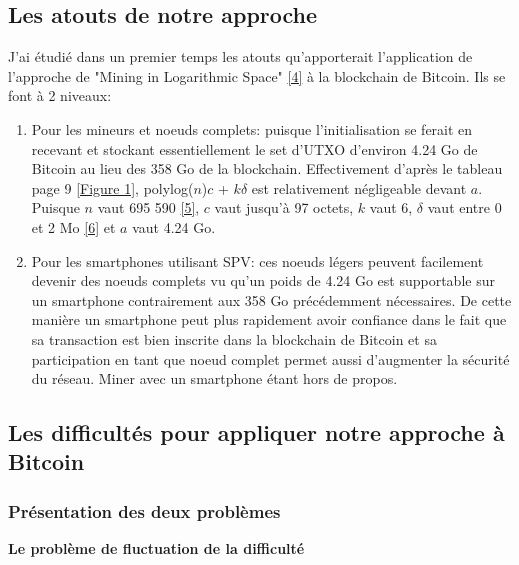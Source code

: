 \documentclass[12pt,a4paper]{article}
\newcommand{\source}[1]{\hyperlink{#1}{[#1]}}
\newcommand{\annexe}[2]{\hyperlink{#1}{[Figure #2]}}
\begin{document}
	\subsection{Les atouts de notre approche}
	
	J'ai étudié dans un premier temps les atouts qu'apporterait l'application de l'approche de "Mining in Logarithmic Space" \source{4} à la blockchain de Bitcoin. Ils se font à 2 niveaux:\\
	\begin{enumerate}
	\item Pour les mineurs et noeuds complets: puisque l'initialisation se ferait en recevant et stockant essentiellement le set d'UTXO d'environ 4.24 Go de Bitcoin au lieu des 358 Go de la blockchain. Effectivement d'après le tableau page 9 \annexe{21}{1}, polylog($n$)$c$ + $k\delta$ est relativement négligeable devant $a$. Puisque $n$ vaut 695 590 \source{5}, $c$ vaut jusqu'à 97 octets, $k$ vaut 6, $\delta$ vaut entre 0 et 2 Mo \source{6} et $a$ vaut 4.24 Go. %
	
	\item Pour les smartphones utilisant SPV: ces noeuds légers peuvent facilement devenir des noeuds complets vu qu'un poids de 4.24 Go est supportable sur un smartphone contrairement aux 358 Go précédemment nécessaires. De cette manière un smartphone peut plus rapidement avoir confiance dans le fait que sa transaction est bien inscrite dans la blockchain de Bitcoin et sa participation en tant que noeud complet permet aussi d'augmenter la sécurité du réseau. %
	Miner avec un smartphone étant hors de propos.
	\end{enumerate}
	
	\subsection{Les difficultés pour appliquer notre approche à Bitcoin}
	
	\subsubsection{Présentation des deux problèmes}
	
	\textbf{Le problème de fluctuation de la difficulté\\}
	
\end{document}
